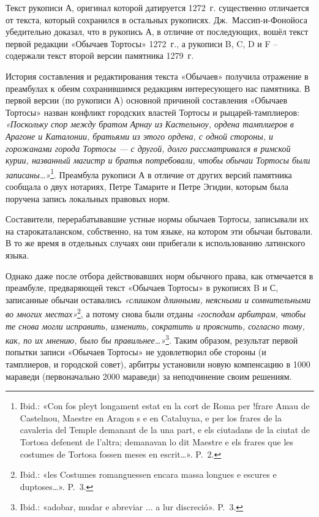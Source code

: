 Текст рукописи А, оригинал которой датируется 1272~г. существенно отличается от текста, который сохранился в остальных рукописях. Дж.~Массип-и-Фонойоса убедительно доказал, что в рукопись А, в отличие от последующих, вошёл текст первой редакции «Обычаев Тортосы» 1272~г., а рукописи B, C, D и F -- содержали текст второй версии памятника 1279~г.

История составления и редактирования текста «Обычаев» получила отражение в преамбулах к обеим сохранившимся редакциям интересующего нас памятника. В первой версии (по рукописи А) основной причиной составления «Обычаев Тортосы» назван конфликт городских властей Тортосы и рыцарей-тамплиеров: \emph{«Поскольку спор между братом }\emph{Арнау}\emph{ из }\emph{Кастельноу}\emph{, ордена тамплиеров в Арагоне и Каталонии, братьями из этого ордена, с одной стороны, и горожанами города Тортосы --- с другой, долго рассматривался в римской курии, названный магистр и братья потребовали, чтобы обычаи Тортосы были записаны…»}\footnote{Ibid.: «Con fos pleyt longament estat en la cort de Roma per !frare Amau de Castelnou, Maestre en Aragon s e en Cataluyna, e per los frares de la cavaleria del Temple demanant de la una part, e els ciutadans de la ciutat de Tortosa defenent de l'altra; demanavan lo dit Maestre e els frares que les costumes de Tortosa fossen meses en escrit…». P.~2.}. Преамбула рукописи А в отличие от других версий памятника сообщала о двух нотариях, Петре Тамарите и Петре Эгидии, которым была поручена запись локальных правовых норм.

Составители, перерабатывавшие устные нормы обычаев Тортосы, записывали их на старокаталанском, собственно, на том языке, на котором эти обычаи бытовали. В то же время в отдельных случаях они прибегали к использованию латинского языка.

Однако даже после отбора действовавших норм обычного права, как отмечается в преамбуле, предваряющей текст «Обычаев Тортосы» в рукописях B и С, записанные обычаи оставались \emph{«слишком длинными, неясными и сомнительными во многих местах»}\footnote{Ibid.: «les Costumes romanguessen encara massa longues e escures e duptoses…». P.~3.}, а потому снова были отданы \emph{«господам арбитрам, чтобы те снова могли исправить, изменить, сократить и прояснить, согласно тому, как, по их мнению, было бы правильнее…»}\footnote{Ibid.: «adobar, mudar e abreviar ... a lur discreció». P.~3.}. Таким образом, результат первой попытки записи «Обычаев Тортосы» не удовлетворил обе стороны (и тамплиеров, и городской совет), арбитры установили новую компенсацию в 1000 мараведи (первоначально 2000 мараведи) за неподчинение своим решениям.


